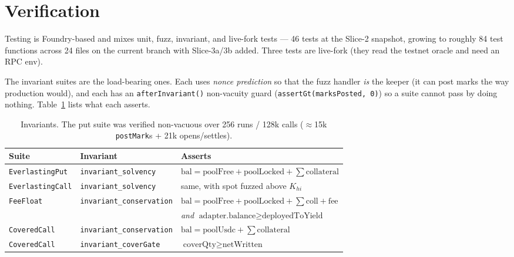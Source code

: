 \documentclass[11pt]{article}
\newcommand{\code}[1]{\texttt{\small #1}}
\begin{document}
\section{Verification}

Testing is Foundry-based and mixes unit, fuzz, invariant, and live-fork tests --- 46 tests at the
Slice-2 snapshot, growing to roughly 84 test functions across 24 files on the current branch with
Slice-3a/3b added. Three tests are live-fork (they read the testnet oracle and need an RPC env).

The invariant suites are the load-bearing ones. Each uses \emph{nonce prediction} so that the fuzz
handler \emph{is} the keeper (it can post marks the way production would), and each has an
\code{afterInvariant()} non-vacuity guard (\code{assertGt(marksPosted, 0)}) so a suite cannot pass by
doing nothing. Table~\ref{tab:inv} lists what each asserts.

\begin{table}[h]
\centering
\begin{tabular}{@{}lll@{}}
\toprule
\textbf{Suite} & \textbf{Invariant} & \textbf{Asserts} \\
\midrule
\code{EverlastingPut}  & \code{invariant\_solvency}     & $\text{bal} = \text{poolFree}+\text{poolLocked}+\sum\text{collateral}$ \\
\code{EverlastingCall} & \code{invariant\_solvency}     & same, with spot fuzzed above $K_{hi}$ \\
\code{FeeFloat}        & \code{invariant\_conservation} & $\text{bal} = \text{poolFree}+\text{poolLocked}+\sum\text{coll}+\text{fee}$ \\
                       &                                & \emph{and} $\text{adapter.balance} \geq \text{deployedToYield}$ \\
\code{CoveredCall}     & \code{invariant\_conservation} & $\text{bal} = \text{poolUsdc}+\sum\text{collateral}$ \\
\code{CoveredCall}     & \code{invariant\_coverGate}    & $\text{coverQty} \geq \text{netWritten}$ \\
\bottomrule
\end{tabular}
\caption{Invariants. The put suite was verified non-vacuous over 256 runs / 128k calls
($\approx$15k \code{postMark}s + 21k opens/settles).}
\label{tab:inv}
\end{table}
\end{document}
